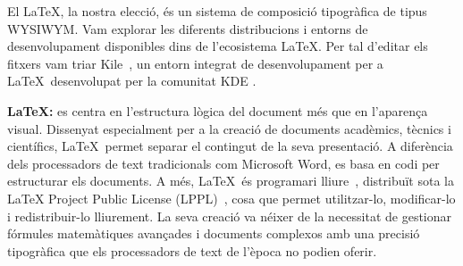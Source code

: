 El \LaTeX, la nostra elecció, és un sistema de composició tipogràfica de tipus WYSIWYM. Vam explorar les diferents distribucions i entorns de desenvolupament disponibles dins de l’ecosistema \LaTeX. Per tal d'editar els fitxers vam triar Kile~\cite{Kile}, un entorn integrat de desenvolupament per a \LaTeX~desenvolupat per la comunitat KDE \cite{KDE}.

\textbf{\LaTeX:} es centra en l’estructura lògica del document més que en l'aparença visual. Dissenyat especialment per a la creació de documents acadèmics, tècnics i científics, \LaTeX~permet separar el contingut de la seva presentació. A diferència dels processadors de text tradicionals com Microsoft Word, es basa en codi per estructurar els documents. A més, \LaTeX~és programari lliure~\cite{ProgramariLliure}, distribuït sota la LaTeX Project Public License (LPPL)~\cite{LPPL}, cosa que permet utilitzar-lo, modificar-lo i redistribuir-lo lliurement. La seva creació va néixer de la necessitat de gestionar fórmules matemàtiques avançades i documents complexos amb una precisió tipogràfica que els processadors de text de l’època no podien oferir.

